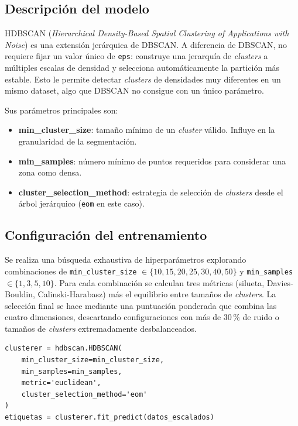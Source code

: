 \documentclass[11pt,a4paper]{article}
\begin{document}
\subsection{Descripción del modelo}

HDBSCAN (\textit{Hierarchical Density-Based Spatial Clustering of Applications with Noise}) es una extensión jerárquica de DBSCAN. A diferencia de DBSCAN, no requiere fijar un valor único de \texttt{eps}: construye una jerarquía de \textit{clusters} a múltiples escalas de densidad y selecciona automáticamente la partición más estable. Esto le permite detectar \textit{clusters} de densidades muy diferentes en un mismo dataset, algo que DBSCAN no consigue con un único parámetro.

Sus parámetros principales son:

\begin{itemize}
    \item \textbf{min\_cluster\_size}: tamaño mínimo de un \textit{cluster} válido. Influye en la granularidad de la segmentación.
    \item \textbf{min\_samples}: número mínimo de puntos requeridos para considerar una zona como densa.
    \item \textbf{cluster\_selection\_method}: estrategia de selección de \textit{clusters} desde el árbol jerárquico (\texttt{eom} en este caso).
\end{itemize}

\subsection{Configuración del entrenamiento}

Se realiza una búsqueda exhaustiva de hiperparámetros explorando combinaciones de \texttt{min\_cluster\_size} $\in \{10, 15, 20, 25, 30, 40, 50\}$ y \texttt{min\_samples} $\in \{1, 3, 5, 10\}$. Para cada combinación se calculan tres métricas (silueta, Davies-Bouldin, Calinski-Harabasz) más el equilibrio entre tamaños de \textit{clusters}. La selección final se hace mediante una puntuación ponderada que combina las cuatro dimensiones, descartando configuraciones con más de 30\,\% de ruido o tamaños de \textit{clusters} extremadamente desbalanceados.

\begin{lstlisting}
clusterer = hdbscan.HDBSCAN(
    min_cluster_size=min_cluster_size,
    min_samples=min_samples,
    metric='euclidean',
    cluster_selection_method='eom'
)
etiquetas = clusterer.fit_predict(datos_escalados)
\end{lstlisting}
\end{document}
